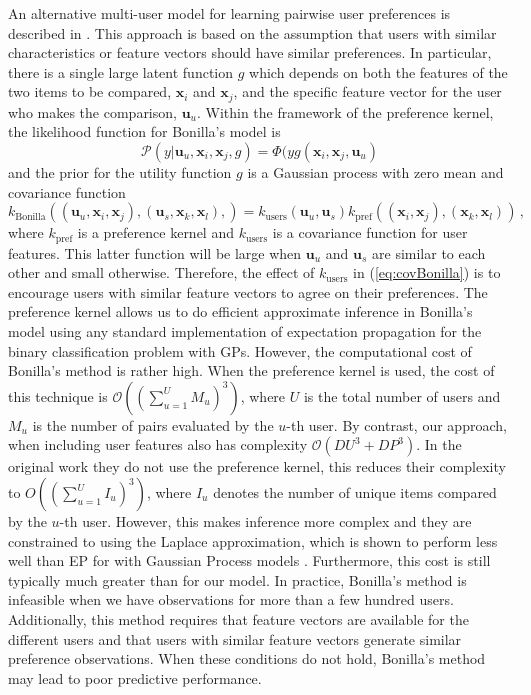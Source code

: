 An alternative multi-user model for learning pairwise user preferences is described in \cite{Bonilla2010}.
This approach is based on the assumption that users with similar characteristics or feature vectors should
have similar preferences. In particular, there is a single large latent function $g$ which depends on both
the features of the two items to be compared, $\mathbf{x}_i$ and $\mathbf{x}_j$, and
the specific feature vector for the user who makes the comparison, $\mathbf{u}_u$.
Within the framework of the preference kernel, the likelihood function for Bonilla's model is
\begin{equation}
\mathcal{P}(y|\mathbf{u}_u,\mathbf{x}_i,\mathbf{x}_j,g) = \Phi(yg(\mathbf{x}_i,\mathbf{x}_j,\mathbf{u}_u)
\end{equation}
and the prior for the utility function $g$ is a Gaussian process with zero mean and covariance function 
\begin{equation}
k_\text{Bonilla}((\mathbf{u}_u,\mathbf{x}_i,\mathbf{x}_j), (\mathbf{u}_s,\mathbf{x}_k,\mathbf{x}_l),) =
k_\text{users}(\mathbf{u}_u,\mathbf{u}_s)k_\text{pref}((\mathbf{x}_i,\mathbf{x}_j),(\mathbf{x}_k,\mathbf{x}_l))\,,\label{eq:covBonilla}
\end{equation}
where $k_\text{pref}$ is a preference kernel and $k_\text{users}$ is a covariance function for user features. This latter
function will be large when $\mathbf{u}_u$ and $\mathbf{u}_s$ are similar to each other and small otherwise.
Therefore, the effect of $k_\text{users}$ in (\ref{eq:covBonilla}) is to 
encourage users with similar feature vectors to
agree on their preferences. The preference kernel allows us to do efficient approximate inference in Bonilla's model
using any standard implementation of expectation propagation for the binary classification problem with GPs.
However, the computational cost of Bonilla's method is rather high. 
When the preference kernel is used, the cost of this technique is $\mathcal{O}((\sum_{u=1}^U M_u)^3)$,
where $U$ is the total number of users and $M_u$ is the number of pairs evaluated by the $u$-th user.
By contrast, our approach, when including user features also has complexity $\mathcal{O}(DU^3+DP^3)$. 
In the original work \cite{Bonilla2010} they do not use the preference kernel, this reduces
their complexity to $O((\sum_{u=1}^UI_u)^3)$, where $I_u$ denotes the number of unique items compared
by the $u$-th user. However, this makes inference more complex and they are constrained to using
the Laplace approximation, which is shown to perform less well than EP for with Gaussian Process models \citep{nickisch2008}. Furthermore, this cost is still typically much greater than for our model.
In practice, Bonilla's method is infeasible when
we have observations for more than a few hundred users. Additionally, this method 
requires that feature vectors are available for the different users and that users with similar feature vectors 
generate similar preference observations. When these conditions do not hold, Bonilla's method may
lead to poor predictive performance.
 

